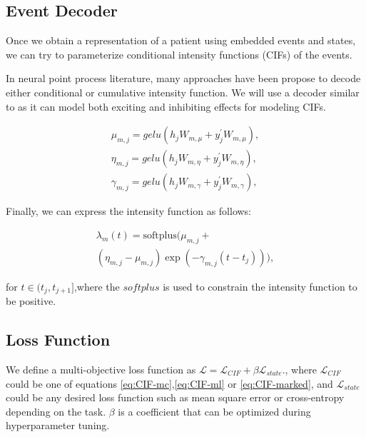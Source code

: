 \documentclass[journal,twoside,web]{ieeecolor}
\begin{document}
\subsection{Event Decoder}
Once we obtain a representation of a patient using embedded events and states, we can try to parameterize conditional intensity functions (CIFs) of the events.

In neural point process literature, many approaches have been propose to decode either conditional or cumulative intensity function. We will use a decoder similar to \cite*{zhangSelfAttentiveHawkesProcess2020} as it can model both exciting and inhibiting effects for modeling CIFs.


\begin{gather} 
    \mu_{m,j}=gelu(h_{j}W_{m,\mu}  +  y^{\prime}_{j}W_{m,\mu}), \\ 
    \eta_{m,j}=gelu(h_{j}W_{m,\eta}  +  y^{\prime}_{j}W_{m,\eta}), \\
    \gamma_{m,j}=gelu(h_{j}W_{m,\gamma}  +  y^{\prime}_{j}W_{m,\gamma}),
    \end{gather}

Finally, we can express the intensity function as follows:

\begin{multline}
    \lambda_m(t)=\text{softplus}(\mu_{m,j}+\\
    (\eta_{m,j}- \mu_{m,j}) \exp(-\gamma_{m,j}(t-t_j))    ),
\end{multline}

for $t \in (t_j, t_{j+1}]$,where the $softplus$ is used to constrain the intensity function to be positive.


\subsection{Loss Function}

We define a multi-objective loss function as $ \mathcal{L}   =   \mathcal{L}_{CIF}   +   \beta \mathcal{L}_{state}$., where $\mathcal{L}_{CIF}$ could be one of equations \ref*{eq:CIF-mc},\ref*{eq:CIF-ml} or \ref*{eq:CIF-marked}, and $\mathcal{L}_{state}$ could be any desired loss function such as mean square error or cross-entropy depending on the task. $\beta$ is a coefficient that can be optimized during hyperparameter tuning.
\end{document}

